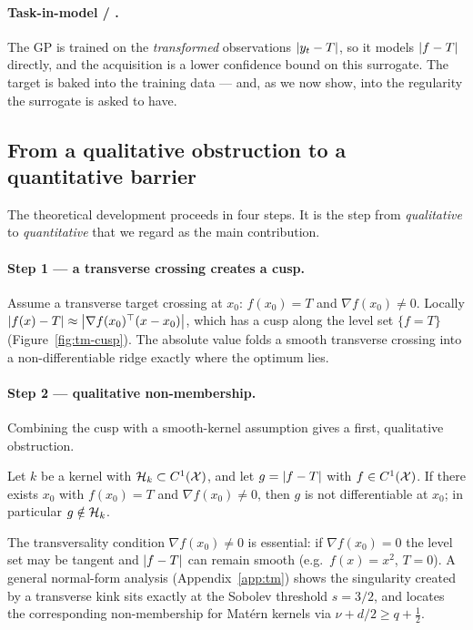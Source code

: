 \paragraph{Task-in-model / \WRONG.}
The GP is trained on the \emph{transformed} observations $\left\lvert y_t-T\right\rvert$, so it
models $\left\lvert f-T\right\rvert$ directly, and the acquisition is a lower confidence bound on
this surrogate. The target is baked into the training data --- and, as we now
show, into the regularity the surrogate is asked to have.

\subsection{From a qualitative obstruction to a quantitative barrier}
\label{sec:contrib-tm-barrier}

The theoretical development proceeds in four steps. It is the step from
\emph{qualitative} to \emph{quantitative} that we regard as the main contribution.

\paragraph{Step 1 --- a transverse crossing creates a cusp.}
Assume a transverse target crossing at $x_0$: $f(x_0)=T$ and $\nabla f(x_0)\neq0$.
Locally $\left\lvert f(x)-T\right\rvert\approx\left\lvert \nabla f(x_0)^\top(x-x_0)\right\rvert$, which has a cusp
along the level set $\{f=T\}$ (Figure~\ref{fig:tm-cusp}). The absolute value
folds a smooth transverse crossing into a non-differentiable ridge exactly where
the optimum lies.

\paragraph{Step 2 --- qualitative non-membership.}
Combining the cusp with a smooth-kernel assumption gives a first, qualitative
obstruction.

\begin{proposition}
\label{prop:tm-nonmember}
Let $k$ be a kernel with $\mathcal{H}_k\subset C^1(\mathcal{X})$, and let $g=\left\lvert f-T\right\rvert$ with
$f\in C^1(\mathcal{X})$. If there exists $x_0$ with $f(x_0)=T$ and $\nabla f(x_0)\neq0$,
then $g$ is not differentiable at $x_0$; in particular $g\notin\mathcal{H}_k$.
\end{proposition}

The transversality condition $\nabla f(x_0)\neq0$ is essential: if
$\nabla f(x_0)=0$ the level set may be tangent and $\left\lvert f-T\right\rvert$ can remain smooth
(e.g.\ $f(x)=x^2$, $T=0$). A general normal-form analysis
(Appendix~\ref{app:tm}) shows the singularity created by a transverse kink sits
exactly at the Sobolev threshold $s=3/2$, and locates the corresponding
non-membership for Mat\'ern kernels via $\nu+d/2\ge q+\tfrac12$.

